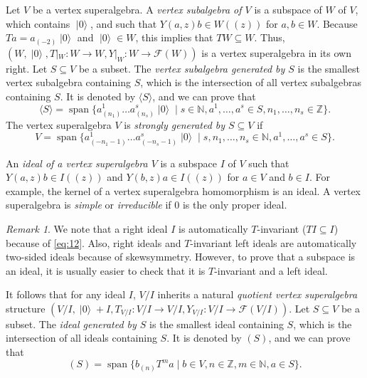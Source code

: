 \documentclass[a4paper, 12pt, reqno]{amsart}
\theoremstyle{remark}
\newtheorem{remark}[theorem]{Remark}
\DeclareMathOperator{\vspan}{span}
\DeclareMathOperator{\vac}{|0\rangle}
\begin{document}
Let $V$ be a vertex superalgebra.
A \emph{vertex subalgebra of $V$} is a subspace of $W$ of $V$, which contains $\vac$, and such that $Y(a, z)b \in W((z))$ for $a, b \in W$.
Because $Ta = a_{(-2)}\vac$ and $\vac \in W$, this implies that $TW \subseteq W$.
Thus, $(W, \vac, T|_{W}: W \to W, Y|_{W}: W \to \mathcal{F}(W))$ is a vertex superalgebra in its own right.
Let $S \subseteq V$ be a subset.
The \emph{vertex subalgebra generated by $S$} is the smallest vertex subalgebra containing $S$, which is the intersection of all vertex subalgebras containing $S$.
It is denoted by $\langle S \rangle$, and we can prove that
\begin{equation*}
  \langle S \rangle = \vspan\{a^1_{(n_1)}\dots a^s_{(n_s)}\vac \mid s \in \mathbb{N}, a^1, \dots, a^s \in S, n_1, \dots, n_s \in \mathbb{Z}\}.
\end{equation*}
The vertex superalgebra $V$ is \emph{strongly generated by $S \subseteq V$} if
\begin{equation*}
  V = \vspan\{a^1_{(-n_1 - 1)}\dots a^s_{(-n_s - 1)}\vac \mid s, n_1, \dots, n_s \in \mathbb{N}, a^1, \dots, a^s \in S\}.
\end{equation*}

An \emph{ideal of a vertex superalgebra $V$} is a subspace $I$ of $V$ such that $Y(a, z)b \in I((z))$ and $Y(b, z)a \in I((z))$ for $a \in V$ and $b \in I$.
For example, the kernel of a vertex superalgebra homomorphism is an ideal.
A vertex superalgebra is \emph{simple} or \emph{irreducible} if $0$ is the only proper ideal.

\begin{remark}
  \label{rmk:12}
  We note that a right ideal $I$ is automatically $T$-invariant ($TI \subseteq I$) because of \eqref{eq:12}.
  Also, right ideals and $T$-invariant left ideals are automatically two-sided ideals because of skewsymmetry.
  However, to prove that a subspace is an ideal, it is usually easier to check that it is $T$-invariant and a left ideal.
\end{remark}

It follows that for any ideal $I$, $V/I$ inherits a natural \emph{quotient vertex superalgebra} structure $(V/I, \vac + I, T_{V/I}: V/I \to V/I, Y_{V/I}: V/I \to \mathcal{F}(V/I))$.
Let $S \subseteq V$ be a subset.
The \emph{ideal generated by $S$} is the smallest ideal containing $S$, which is the intersection of all ideals containing $S$.
It is denoted by $(S)$, and we can prove that
\begin{equation*}
  (S) = \vspan\{b_{(n)}T^ma \mid b \in V, n \in \mathbb{Z}, m \in \mathbb{N}, a \in S\}.
\end{equation*}
\end{document}
